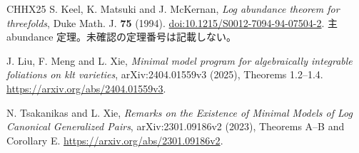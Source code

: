 \documentclass[12pt]{amsart}
\theoremstyle{definition}
\theoremstyle{remark}
\numberwithin{equation}{section}
\begin{document}
\begin{thebibliography}{CHHX25}
S. Keel, K. Matsuki and J. McKernan, \emph{Log abundance theorem for threefolds}, Duke Math. J. \textbf{75} (1994). \href{https://doi.org/10.1215/S0012-7094-94-07504-2}{doi:10.1215/S0012-7094-94-07504-2}. 主 abundance 定理。未確認の定理番号は記載しない。

J. Liu, F. Meng and L. Xie, \emph{Minimal model program for algebraically integrable foliations on klt varieties}, arXiv:2404.01559v3 (2025), Theorems 1.2--1.4. \url{https://arxiv.org/abs/2404.01559v3}.

N. Tsakanikas and L. Xie, \emph{Remarks on the Existence of Minimal Models of Log Canonical Generalized Pairs}, arXiv:2301.09186v2 (2023), Theorems A--B and Corollary E. \url{https://arxiv.org/abs/2301.09186v2}.

\end{thebibliography}

\end{document}
